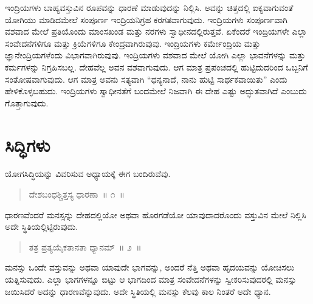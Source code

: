 
\vskip 3pt


ಇಂದ್ರಿಯಗಳು ಬಾಹ್ಯವಸ್ತುವಿನ ರೂಪವನ್ನು ಧಾರಣೆ ಮಾಡುವುದನ್ನು ನಿಲ್ಲಿಸಿ. ಅವನ್ನು ಚಿತ್ತದಲ್ಲಿ ಐಕ್ಯವಾಗುವಂತೆ ಯೋಗಿಯು ಮಾಡಿದಮೇಲೆ ಸಂಪೂರ್ಣ ಇಂದ್ರಿಯನಿಗ್ರಹ ಕರಗತವಾಗುವುದು. ಇಂದ್ರಿಯಗಳು ಸಂಪೂರ್ಣವಾಗಿ ವಶವಾದ ಮೇಲೆ ಪ್ರತಿಯೊಂದು ಮಾಂಸಖಂಡ ಮತ್ತು ನರಗಳು ಸ್ವಾಧೀನದಲ್ಲಿರುತ್ತವೆ. ಏಕೆಂದರೆ ಇಂದ್ರಿಯಗಳೇ ಎಲ್ಲಾ ಸಂವೇದನೆಗಳಿಗೂ ಮತ್ತು ಕ್ರಿಯೆಗಳಿಗೂ ಕೇಂದ್ರವಾಗಿರುವುವು. ಇಂದ್ರಿಯಗಳು ಕರ್ಮೇಂದ್ರಿಯ ಮತ್ತು ಜ್ಞಾನೇಂದ್ರಿಯಗಳೆಂದು ವಿಭಾಗವಾಗಿರುವುವು. ಇಂದ್ರಿಯಗಳು ವಶವಾದ ಮೇಲೆ ಯೋಗಿ ಎಲ್ಲಾ ಭಾವನೆಗಳನ್ನು ಮತ್ತು ಕರ್ಮಗಳನ್ನು ನಿಗ್ರಹಿಸಬಲ್ಲ. ದೇಹವೆಲ್ಲ ಅವನ ವಶವಾಗುವುದು. ಆಗ ಮಾತ್ರ ಪ್ರಪಂಚದಲ್ಲಿ ಹುಟ್ಟಿದುದರಿಂದ ಒಬ್ಬನಿಗೆ ಸಂತೋಷವಾಗುವುದು. ಆಗ ಮಾತ್ರ ಅವನು ಸತ್ಯವಾಗಿ “ಧನ್ಯನಾದೆ, ನಾನು ಹುಟ್ಟಿ ಸಾರ್ಥಕವಾಯಿತು” ಎಂದು ಹೇಳಿಕೊಳ್ಳಬಹುದು. ಇಂದ್ರಿಯಗಳು ಸ್ವಾಧೀನತೆಗೆ ಬಂದಮೇಲೆ ನಿಜವಾಗಿ ಈ ದೇಹ ಎಷ್ಟು ಅದ್ಭುತವಾಗಿದೆ ಎಂಬುದು ಗೊತ್ತಾಗುವುದು.

\chapter{ಸಿದ್ಧಿಗಳು}%

ಯೋಗಸಿದ್ಧಿಯನ್ನು ವಿವರಿಸುವ ಅಧ್ಯಾಯಕ್ಕೆ ಈಗ ಬಂದಿರುವೆವು. 

\vspace{-0.2cm}

\begin{verse}
ದೇಶಬಂಧಶ್ಚಿತ್ತಸ್ಯ ಧಾರಣಾ~॥ ೧~॥
\end{verse}

\vspace{-0.3cm}


ಧಾರಣವೆಂದರೆ ಮನಸ್ಸನ್ನು ದೇಹದಲ್ಲಿಯೋ ಅಥವಾ ಹೊರಗಡೆಯೋ ಯಾವುದಾದರೊಂದು ವಸ್ತುವಿನ ಮೇಲೆ ನಿಲ್ಲಿಸಿ ಅದೇ ಸ್ಥಿತಿಯಲ್ಲಿಟ್ಟಿರುವುದು. 

\vspace{-0.2cm}

\begin{verse}
ತತ್ರ ಪ್ರತ್ಯಯೈಕತಾನತಾ ಧ್ಯಾನಮ್​~॥ ೨~॥
\end{verse}

\vspace{-0.3cm}


ಮನಸ್ಸು ಒಂದೇ ವಸ್ತುವನ್ನು ಅಥವಾ ಯಾವುದೇ ಭಾಗವನ್ನು, ಅಂದರೆ ನೆತ್ತಿ ಅಥವಾ ಹೃದಯವನ್ನು ಯೋಚಿಸಲು ಯತ್ನಿಸುವುದು. ಎಲ್ಲಾ ಭಾಗಗಳನ್ನೂ ಬಿಟ್ಟು ಆ ಭಾಗದಿಂದ ಮಾತ್ರ ಸಂವೇದನೆಗಳನ್ನು ಸ್ವೀಕರಿಸುವುದರಲ್ಲಿ ಮನಸ್ಸು ಜಯಿಸಿದರೆ ಅದನ್ನು ಧಾರಣವೆನ್ನುವುದು. ಅದೇ ಸ್ಥಿತಿಯಲ್ಲಿ ಮನಸ್ಸು ಕೆಲವು ಕಾಲ ನಿಂತರೆ ಅದೇ ಧ್ಯಾನ. 

